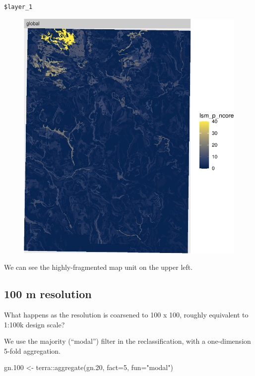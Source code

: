 \documentclass[
  letterpaper,
  DIV=11,
  numbers=noendperiod]{scrartcl}
\newenvironment{Shaded}{\begin{snugshade}}{\end{snugshade}}
\newcommand{\AttributeTok}[1]{\textcolor[rgb]{0.40,0.45,0.13}{#1}}
\newcommand{\DecValTok}[1]{\textcolor[rgb]{0.68,0.00,0.00}{#1}}
\newcommand{\FloatTok}[1]{\textcolor[rgb]{0.68,0.00,0.00}{#1}}
\newcommand{\FunctionTok}[1]{\textcolor[rgb]{0.28,0.35,0.67}{#1}}
\newcommand{\NormalTok}[1]{\textcolor[rgb]{0.00,0.23,0.31}{#1}}
\newcommand{\OtherTok}[1]{\textcolor[rgb]{0.00,0.23,0.31}{#1}}
\newcommand{\SpecialCharTok}[1]{\textcolor[rgb]{0.37,0.37,0.37}{#1}}
\newcommand{\StringTok}[1]{\textcolor[rgb]{0.13,0.47,0.30}{#1}}
\begin{document}
\begin{verbatim}
$layer_1
\end{verbatim}

\begin{figure}[H]

{\centering \includegraphics{PatternAnalysisWorkshopTutorial_files/figure-pdf/show-ncore-20-1.pdf}

}

\end{figure}

We can see the highly-fragmented map unit on the upper left.

\hypertarget{m-resolution-1}{%
\subsection{100 m resolution}\label{m-resolution-1}}

What happens as the resolution is coarsened to 100 x 100, roughly
equivalent to 1:100k design scale?

We use the majority (``modal'') filter in the reclassification, with a
one-dimension 5-fold aggregation.

\begin{Shaded}
\begin{Highlighting}[]
\NormalTok{gn}\FloatTok{.100} \OtherTok{\textless{}{-}}\NormalTok{ terra}\SpecialCharTok{::}\FunctionTok{aggregate}\NormalTok{(gn}\FloatTok{.20}\NormalTok{, }\AttributeTok{fact=}\DecValTok{5}\NormalTok{, }\AttributeTok{fun=}\StringTok{"modal"}\NormalTok{)}
\end{Highlighting}
\end{Shaded}
\end{document}
